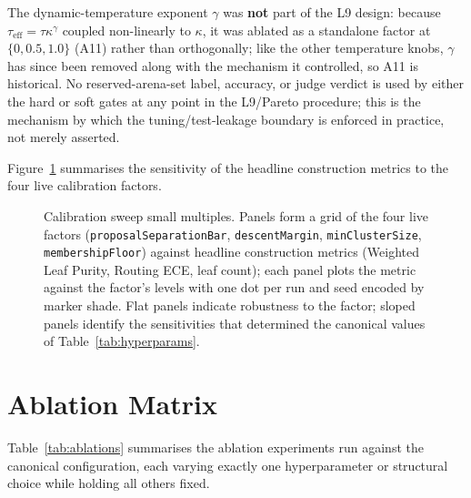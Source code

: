 The dynamic-temperature exponent $\gamma$ was \textbf{not} part of the
L9 design: because $\tau_{\text{eff}} = \tau\kappa^{\gamma}$ coupled
non-linearly to $\kappa$, it was ablated as a standalone factor at
$\{0, 0.5, 1.0\}$ (A11) rather than orthogonally; like the other
temperature knobs, $\gamma$ has since been removed along with the
mechanism it controlled, so A11 is historical. No reserved-arena-set
label, accuracy, or judge verdict is used by either the hard or soft
gates at any point in the L9/Pareto procedure; this is the mechanism
by which the tuning/test-leakage boundary is enforced in practice, not
merely asserted.

Figure~\ref{fig:calibration-sweep} summarises the sensitivity of the
headline construction metrics to the four live calibration factors.

\begin{figure}[h]
\centering
{}
\caption{Calibration sweep small multiples. Panels form a grid of the
four live factors (\texttt{proposalSeparationBar}, \texttt{descentMargin},
\texttt{minClusterSize}, \texttt{membershipFloor}) against
headline construction metrics (Weighted Leaf Purity, Routing ECE,
leaf count); each panel plots the metric against the factor's
levels with one dot per run and seed encoded by marker shade. Flat
panels indicate robustness to the factor; sloped panels identify the
sensitivities that determined the canonical values of
Table~\ref{tab:hyperparams}.}
\label{fig:calibration-sweep}
\end{figure}

\section{Ablation Matrix}\label{sec:appendix-ablations}

Table~\ref{tab:ablations} summarises the ablation experiments run
against the canonical configuration, each varying exactly one
hyperparameter or structural choice while holding all others fixed.

